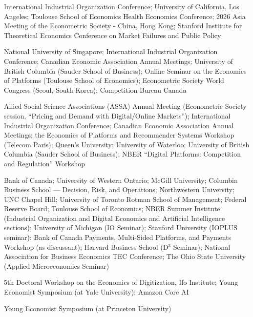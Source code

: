 \documentclass[11pt]{article} %
\begin{document}
 International Industrial Organization Conference;
	University of California, Los Angeles;
	Toulouse School of Economics Health Economics Conference;
	2026 Asia Meeting of the Econometric Society - China, Hong Kong;
	Stanford Institute for Theoretical Economics Conference on Market Failures and Public Policy

 National University of Singapore; 
	 International Industrial Organization Conference;
	 Canadian Economic Association Annual Meetings;
	 University of British Columbia (Sauder School of Business);
	 Online Seminar on the Economics of Platforms (Toulouse School of Economics);
	 Econometric Society World Congress (Seoul, South Korea); 
	 Competition Bureau Canada

 Allied Social Science Associations (ASSA) Annual Meeting
	(Econometric Society session, ``Pricing and Demand with Digital/Online Markets'');
	International Industrial Organization Conference;
	 Canadian Economic Association Annual Meetings;
		the Economics of Platforms and Recommender Systems Workshop (Telecom Paris);
		Queen's University; University of Waterloo;
            University of British Columbia (Sauder School of Business);
            NBER ``Digital Platforms: Competition and Regulation'' Workshop
	
 Bank of Canada; University of Western Ontario;
	McGill University; Columbia Business School --- Decision, Risk, and Operations;
	Northwestern University; UNC Chapel Hill; University of Toronto Rotman School
	of Management; Federal Reserve Board; Toulouse School of Economics;
	NBER Summer Institute (Industrial Organization and Digital Economics and Artificial
	Intelligence sections); University of Michigan (IO Seminar);
	Stanford University (IOPLUS seminar); Bank of Canada Payments, Multi-Sided Platforms, and Payments
	Workshop (as discussant); 
	Harvard Business School (D${}^3$ Seminar); 
	National Association for Business Economics TEC Conference;
	The Ohio State University (Applied Microeconomics Seminar)


 5th Doctoral Workshop on the Economics of Digitization, Ifo Institute; 
	Young Economist Symposium (at Yale University); Amazon Core AI


 Young Economist Symposium (at Princeton University)
\end{document}
